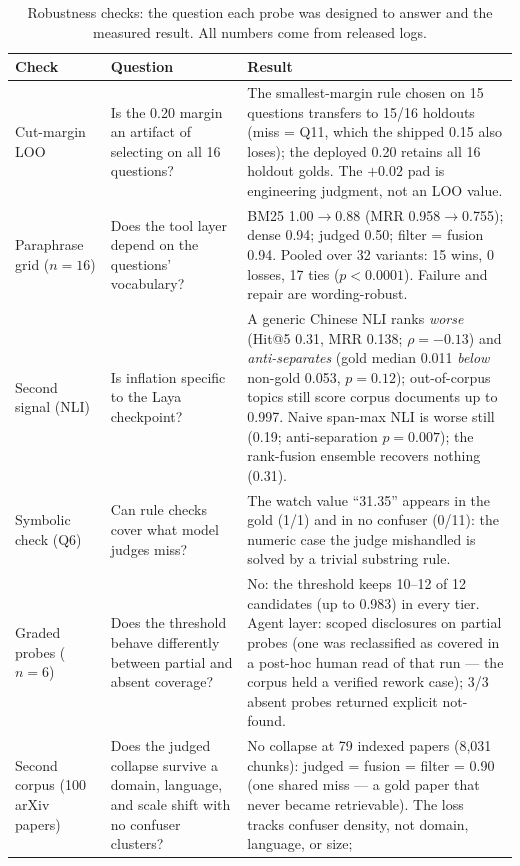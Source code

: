 \begin{table}[t]
\centering
\scriptsize
\setlength{\tabcolsep}{2.5pt}
\caption{Robustness checks: the question each probe was designed to answer
and the measured result. All numbers come from released logs.}
\label{tab:robustness}
\begin{tabular}{p{2.7cm}p{3.9cm}p{5.9cm}}
\toprule
Check & Question & Result \\
\midrule
Cut-margin LOO & Is the 0.20 margin an artifact of selecting on all 16
questions? & The smallest-margin rule chosen on 15 questions transfers to
15/16 holdouts (miss = Q11, which the shipped 0.15 also loses); the
deployed 0.20 retains all 16 holdout golds. The $+0.02$ pad is
engineering judgment, not an LOO value. \\
Paraphrase grid ($n{=}16$) & Does the tool layer depend on the questions'
vocabulary? & BM25 1.00$\to$0.88 (MRR 0.958$\to$0.755); dense 0.94;
judged 0.50; filter = fusion 0.94. Pooled over 32 variants: 15 wins,
0 losses, 17 ties ($p < 0.0001$). Failure and repair are wording-robust. \\
Second signal (NLI) & Is inflation specific to the Laya checkpoint? &
A generic Chinese NLI ranks \emph{worse} (Hit@5 0.31, MRR 0.138;
$\rho = -0.13$) and \emph{anti-separates} (gold median 0.011 \emph{below}
non-gold 0.053, $p = 0.12$); out-of-corpus topics still score corpus
documents up to 0.997. Naive span-max NLI is worse still (0.19;
anti-separation $p = 0.007$); the rank-fusion ensemble recovers nothing
(0.31). \\
Symbolic check (Q6) & Can rule checks cover what model judges miss? &
The watch value ``31.35'' appears in the gold (1/1) and in no confuser
(0/11): the numeric case the judge mishandled is solved by a trivial
substring rule. \\
Graded probes ($n{=}6$) & Does the threshold behave differently between
partial and absent coverage? & No: the threshold keeps 10--12 of 12
candidates (up to 0.983) in every tier. Agent layer: scoped disclosures
on partial probes (one was reclassified as covered in a post-hoc human
read of that run --- the corpus held a
verified rework case); 3/3 absent probes returned explicit not-found. \\
Second corpus (100 arXiv papers) & Does the judged collapse survive a
domain, language, and scale shift with no confuser clusters? & No
collapse at 79 indexed papers (8{,}031 chunks): judged = fusion =
filter = 0.90 (one shared miss --- a gold paper that never became
retrievable).
The loss tracks confuser density, not domain, language, or size;

\end{tabular}
\end{table}
